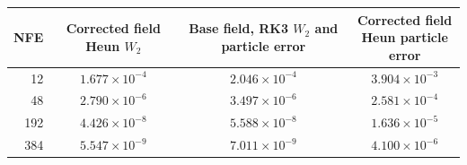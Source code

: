 \begin{tabular}{rccc}
\toprule
NFE & \shortstack{Corrected field\\Heun $W_2$} & \shortstack{Base field, RK3\\$W_2$ and particle error} & \shortstack{Corrected field\\Heun particle error} \\
\midrule
12 & $1.677\times10^{-4}$ & $2.046\times10^{-4}$ & $3.904\times10^{-3}$ \\
48 & $2.790\times10^{-6}$ & $3.497\times10^{-6}$ & $2.581\times10^{-4}$ \\
192 & $4.426\times10^{-8}$ & $5.588\times10^{-8}$ & $1.636\times10^{-5}$ \\
384 & $5.547\times10^{-9}$ & $7.011\times10^{-9}$ & $4.100\times10^{-6}$ \\
\bottomrule
\end{tabular}
